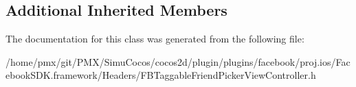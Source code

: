 \subsection*{Additional Inherited Members}


The documentation for this class was generated from the following file\+:\begin{DoxyCompactItemize}
\item 
/home/pmx/git/\+P\+M\+X/\+Simu\+Cocos/cocos2d/plugin/plugins/facebook/proj.\+ios/\+Facebook\+S\+D\+K.\+framework/\+Headers/F\+B\+Taggable\+Friend\+Picker\+View\+Controller.\+h\end{DoxyCompactItemize}
